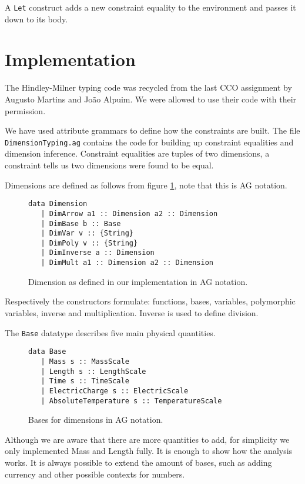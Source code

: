 \documentclass[a4paper,10pt]{article}
\begin{document}
A \texttt{Let} construct adds a new constraint equality to the environment and passes it down to its body.

\section{Implementation}\label{imp}

The Hindley-Milner typing code was recycled from the last CCO assignment by Augusto Martins and Jo\~{a}o Alpuim. We were allowed to use their code with their permission.

We have used attribute grammars to define how the constraints are built.
The file \texttt{DimensionTyping.ag} contains the code for building up constraint equalities and dimension inference.
Constraint equalities are tuples of two dimensions, a constraint tells us two dimensions were found to be equal.

Dimensions are defined as follows from figure \ref{datadim}, note that this is AG notation.
\begin{figure}[h]
\begin{lstlisting}
data Dimension
   | DimArrow a1 :: Dimension a2 :: Dimension
   | DimBase b :: Base
   | DimVar v :: {String}
   | DimPoly v :: {String}
   | DimInverse a :: Dimension
   | DimMult a1 :: Dimension a2 :: Dimension
\end{lstlisting}
\caption{Dimension as defined in our implementation in AG notation.}\label{datadim}
\end{figure}

Respectively the constructors formulate: functions, bases, variables, polymorphic variables, inverse and multiplication. Inverse is used to define division.

The \texttt{Base} datatype describes five main physical quantities.
\begin{figure}[h]
\begin{lstlisting}
data Base 
   | Mass s :: MassScale
   | Length s :: LengthScale
   | Time s :: TimeScale
   | ElectricCharge s :: ElectricScale 
   | AbsoluteTemperature s :: TemperatureScale
\end{lstlisting}
\caption{Bases for dimensions in AG notation.}\label{database}
\end{figure}

Although we are aware that there are more quantities to add, for simplicity we only implemented Mass and Length fully.
It is enough to show how the analysis works.
It is always possible to extend the amount of bases, such as adding currency and other possible contexts for numbers.
\end{document}
